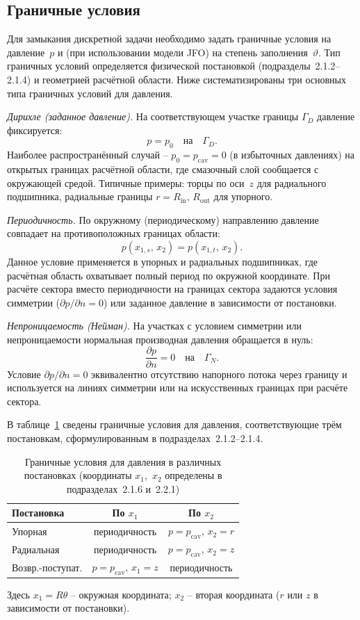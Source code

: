 \subsection{Граничные условия}

Для замыкания дискретной задачи необходимо задать граничные условия на давление~$p$ и (при использовании модели JFO) на степень заполнения~$\vartheta$. Тип граничных условий определяется физической постановкой (подразделы~2.1.2--2.1.4) и геометрией расчётной области. Ниже систематизированы три основных типа граничных условий для давления.

\textit{Дирихле (заданное давление).}
На соответствующем участке границы $\Gamma_D$ давление фиксируется:
\[
  p = p_0 \quad \text{на} \quad \Gamma_D.
\]
Наиболее распространённый случай -- $p_0 = p_{\mathrm{cav}} = 0$ (в избыточных давлениях) на открытых границах расчётной области, где смазочный слой сообщается с окружающей средой. Типичные примеры: торцы по оси~$z$ для радиального подшипника, радиальные границы $r = R_{\mathrm{in}},\, R_{\mathrm{out}}$ для упорного.

\textit{Периодичность.}
По окружному (периодическому) направлению давление совпадает на противоположных границах области:
\[
  p(x_{1,s},\, x_2) = p(x_{1,t},\, x_2).
\]
Данное условие применяется в упорных и радиальных подшипниках, где расчётная область охватывает полный период по окружной координате. При расчёте сектора вместо периодичности на границах сектора задаются условия симметрии ($\partial p / \partial n = 0$) или заданное давление в зависимости от постановки.

\textit{Непроницаемость (Нейман).}
На участках с условием симметрии или непроницаемости нормальная производная давления обращается в нуль:
\[
  \frac{\partial p}{\partial n} = 0 \quad \text{на} \quad \Gamma_N.
\]
Условие $\partial p / \partial n = 0$ эквивалентно отсутствию напорного потока через границу и используется на линиях симметрии или на искусственных границах при расчёте сектора.

В таблице~\ref{tab:bc_summary} сведены граничные условия для давления, соответствующие трём постановкам, сформулированным в подразделах~2.1.2--2.1.4.

\begin{table}[!ht]
\centering
\caption{Граничные условия для давления в различных постановках
  (координаты $x_1$,~$x_2$ определены в подразделах~2.1.6 и~2.2.1)}
\label{tab:bc_summary}
\begin{tabular}{|l|c|c|}
\hline
\textbf{Постановка}   & \textbf{По $x_1$}
                       & \textbf{По $x_2$} \\
\hline
Упорная
  & периодичность
  & $p = p_{\mathrm{cav}}$, $x_2 = r$ \\
\hline
Радиальная
  & периодичность
  & $p = p_{\mathrm{cav}}$, $x_2 = z$ \\
\hline
Возвр.-поступат.
  & $p = p_{\mathrm{cav}}$, $x_1 = z$
  & периодичность \\
\hline
\end{tabular}

\medskip
\small
Здесь $x_1 = R\theta$ -- окружная координата;
$x_2$ -- вторая координата ($r$ или $z$ в зависимости от постановки).
\end{table}

